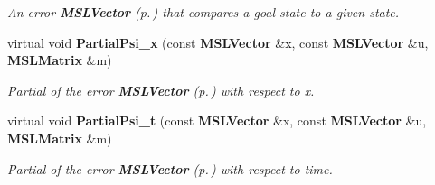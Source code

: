 \begin{CompactItemize}
\begin{CompactList}\small\item\em An error {\bf MSLVector} {\rm (p.\,\pageref{classMSLVector})} that compares a goal state to a given state.\item\end{CompactList}\item 
virtual void {\bf Partial\-Psi\_\-x} (const {\bf MSLVector} \&x, const {\bf MSLVector} \&u, {\bf MSLMatrix} \&m)
\begin{CompactList}\small\item\em Partial of the error {\bf MSLVector} {\rm (p.\,\pageref{classMSLVector})} with respect to x.\item\end{CompactList}\item 
virtual void {\bf Partial\-Psi\_\-t} (const {\bf MSLVector} \&x, const {\bf MSLVector} \&u, {\bf MSLMatrix} \&m)
\begin{CompactList}\small\item\em Partial of the error {\bf MSLVector} {\rm (p.\,\pageref{classMSLVector})} with respect to time.\item\end{CompactList}\end{CompactItemize}
